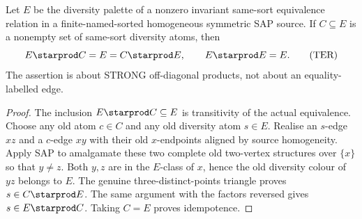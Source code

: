 \begin{lemma}
\label{lem:typed-equivalence-reproduction}
Let $E$ be the diversity palette of a nonzero invariant
same-sort equivalence relation in a finite-named-sorted
homogeneous symmetric SAP source. If $C\subseteq E$ is
a nonempty set of same-sort diversity atoms, then
\[
                   E\starprod C=E=C\starprod E,
              \qquad E\starprod E=E.
 \tag{TER}\label{eq:typed-equivalence-reproduction}
\]
The assertion is about STRONG off-diagonal products,
not about an equality-labelled edge.
\end{lemma}
\begin{proof}
The inclusion $E\starprod C\subseteq E$
is transitivity of the actual equivalence.
Choose any old atom $c\in C$ and any
old diversity atom $s\in E$.
Realise an $s$-edge $xz$ and a $c$-edge
$xy$ with their old $x$-endpoints aligned
by source homogeneity. Apply SAP to
amalgamate these two complete old
two-vertex structures over $\{x\}$ so
that $y\ne z$. Both $y,z$ are in the
$E$-class of $x$, hence the old
diversity colour of $yz$ belongs to $E$.
The genuine three-distinct-points
triangle proves $s\in C\starprod E$.
The same argument with the factors reversed
gives $s\in E\starprod C$.
Taking $C=E$ proves idempotence.
\end{proof}

